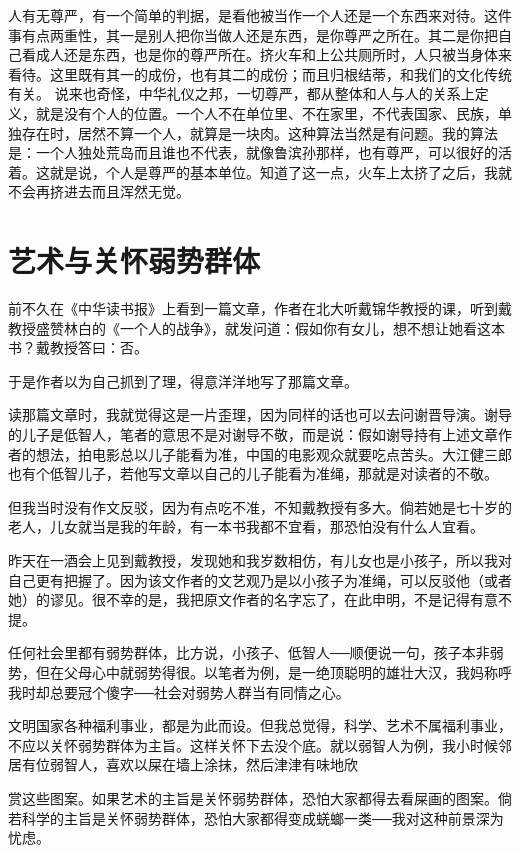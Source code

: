 人有无尊严，有一个简单的判据，是看他被当作一个人还是一个东西来对待。这件事有点两重性，其一是别人把你当做人还是东西，是你尊严之所在。其二是你把自己看成人还是东西，也是你的尊严所在。挤火车和上公共厕所时，人只被当身体来看待。这里既有其一的成份，也有其二的成份；而且归根结蒂，和我们的文化传统有关。 说来也奇怪，中华礼仪之邦，一切尊严，都从整体和人与人的关系上定义，就是没有个人的位置。一个人不在单位里、不在家里，不代表国家、民族，单独存在时，居然不算一个人，就算是一块肉。这种算法当然是有问题。我的算法是：一个人独处荒岛而且谁也不代表，就像鲁滨孙那样，也有尊严，可以很好的活着。这就是说，个人是尊严的基本单位。知道了这一点，火车上太挤了之后，我就不会再挤进去而且浑然无觉。

\chapter{艺术与关怀弱势群体}

前不久在《中华读书报》上看到一篇文章，作者在北大听戴锦华教授的课，听到戴教授盛赞林白的《一个人的战争》，就发问道：假如你有女儿，想不想让她看这本书？戴教授答曰：否。 

于是作者以为自己抓到了理，得意洋洋地写了那篇文章。 

读那篇文章时，我就觉得这是一片歪理，因为同样的话也可以去问谢晋导演。谢导的儿子是低智人，笔者的意思不是对谢导不敬，而是说：假如谢导持有上述文章作者的想法，拍电影总以儿子能看为准，中国的电影观众就要吃点苦头。大江健三郎也有个低智儿子，若他写文章以自己的儿子能看为准绳，那就是对读者的不敬。 

但我当时没有作文反驳，因为有点吃不准，不知戴教授有多大。倘若她是七十岁的老人，儿女就当是我的年龄，有一本书我都不宜看，那恐怕没有什么人宜看。 

昨天在一酒会上见到戴教授，发现她和我岁数相仿，有儿女也是小孩子，所以我对自己更有把握了。因为该文作者的文艺观乃是以小孩子为准绳，可以反驳他（或者她）的谬见。很不幸的是，我把原文作者的名字忘了，在此申明，不是记得有意不提。 

任何社会里都有弱势群体，比方说，小孩子、低智人──顺便说一句，孩子本非弱势，但在父母心中就弱势得很。以笔者为例，是一绝顶聪明的雄壮大汉，我妈称呼我时却总要冠个傻字──社会对弱势人群当有同情之心。 

文明国家各种福利事业，都是为此而设。但我总觉得，科学、艺术不属福利事业，不应以关怀弱势群体为主旨。这样关怀下去没个底。就以弱智人为例，我小时候邻居有位弱智人，喜欢以屎在墙上涂抹，然后津津有味地欣 

赏这些图案。如果艺术的主旨是关怀弱势群体，恐怕大家都得去看屎画的图案。倘若科学的主旨是关怀弱势群体，恐怕大家都得变成蜣螂一类──我对这种前景深为忧虑。 

